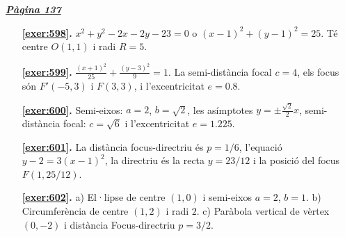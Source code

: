
\hyperlink{page.137}{\textbf{\em Pàgina 137}}
\begin{enumerate}
\item[\fontfamily{phv}\selectfont\color{blue}\textbf{\ref{exer:598}. }] \label{ans:598} 
$x^2+y^2-2x-2y-23=0$ o $(x-1)^2+(y-1)^2=25$. Té centre $O(1,1)$ i radi $R=5$.
 \end{enumerate}
\begin{enumerate}
\item[\fontfamily{phv}\selectfont\color{blue}\textbf{\ref{exer:599}. }] \label{ans:599} 
$\frac {(x+1)^2}{25}+\frac {(y-3)^2}{9}=1$. La semi-distància focal $c=4$, els focus són $F'(-5,3)$ i $F(3,3)$, i l'excentricitat $e=0.8$.
\item[\fontfamily{phv}\selectfont\color{blue}\textbf{\ref{exer:600}. }] \label{ans:600} 
Semi-eixos: $a=2$, $b=\sqrt {2}$, les asímptotes $y=\pm \frac {\sqrt {2}}{2}x$, semi-distància focal: $c=\sqrt {6}$ i l'excentricitat $e=1.225$.
\item[\fontfamily{phv}\selectfont\color{blue}\textbf{\ref{exer:601}. }] \label{ans:601} 
La distància focus-directriu és $p=1/6$, l'equació $y-2=3 (x-1)^2$, la directriu és la recta $y=23/12$ i la posició del focus $F(1, 25/12)$.
\item[\fontfamily{phv}\selectfont\color{blue}\textbf{\ref{exer:602}. }] \label{ans:602} 
a) El·lipse de centre $(1,0)$ i semi-eixos $a=2$, $b=1$. b) Circumferència de centre $(1,2)$ i radi $2$. c) Paràbola vertical de vèrtex $(0,-2)$ i distància Focus-directriu $p=3/2$.
 \end{enumerate}

 \vspace{1cm} 


\vspace{0.3cm}


